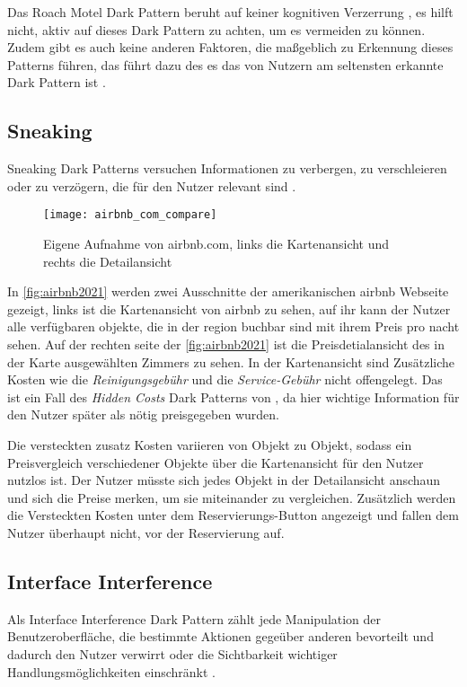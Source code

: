 \documentclass[conference,compsoc,final,a4paper]{IEEEtran}
\begin{document}
Das Roach Motel Dark Pattern beruht auf keiner kognitiven Verzerrung \autocite{Mathur2019}, es hilft nicht, aktiv auf dieses Dark Pattern zu achten, um es vermeiden zu können. Zudem gibt es auch keine anderen Faktoren, die maßgeblich zu Erkennung dieses Patterns führen, das führt dazu des es das von Nutzern am seltensten erkannte Dark Pattern ist \autocite{M.Bhoot2020}.
\subsection{Sneaking}
Sneaking Dark Patterns versuchen Informationen zu verbergen, zu verschleieren oder zu verzögern, die für den Nutzer relevant sind \autocite{Gray_2018}.

\begin{figure}[ht!]
  \centering
  \texttt{[image: airbnb\_com\_compare]}
  \caption{Eigene Aufnahme von airbnb.com, links die Kartenansicht und rechts die Detailansicht ~\autocite{airbnb2021}}
  \label{fig:airbnb2021}
\end{figure}

In \autoref{fig:airbnb2021} werden zwei Ausschnitte der amerikanischen airbnb Webseite gezeigt, links ist die Kartenansicht von airbnb zu sehen, auf ihr kann der Nutzer alle verfügbaren objekte, die in der region buchbar sind mit ihrem Preis pro nacht sehen. Auf der rechten seite der \autoref{fig:airbnb2021} ist die Preisdetialansicht des in der Karte ausgewählten Zimmers zu sehen. In der Kartenansicht sind Zusätzliche Kosten wie die \textit{Reinigungsgebühr} und die \textit{Service-Gebühr} nicht offengelegt. Das ist ein Fall des \textit{Hidden Costs} Dark Patterns von \citeauthor{Brignull} \autocite{Brignull}, da hier wichtige Information für den Nutzer später als nötig preisgegeben wurden.

Die versteckten zusatz Kosten variieren von Objekt zu Objekt, sodass ein Preisvergleich verschiedener Objekte über die Kartenansicht für den Nutzer nutzlos ist. Der Nutzer müsste sich jedes Objekt in der Detailansicht anschaun und sich die Preise merken, um sie miteinander zu vergleichen. Zusätzlich werden die Versteckten Kosten unter dem Reservierungs-Button angezeigt und fallen dem Nutzer überhaupt nicht, vor der Reservierung auf.

\subsection{Interface Interference}
Als Interface Interference Dark Pattern zählt jede Manipulation der Benutzeroberfläche, die bestimmte Aktionen gegeüber anderen bevorteilt und dadurch den Nutzer verwirrt oder die Sichtbarkeit wichtiger Handlungsmöglichkeiten einschränkt \autocite{Gray_2018}.
\end{document}
